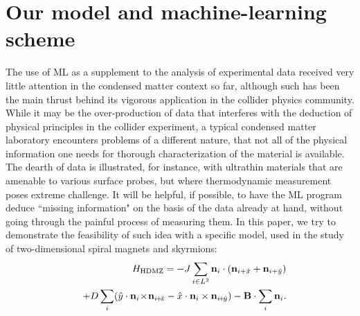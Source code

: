 \documentclass[reprint,amsmath,amssymb,aps,showpacs,superscriptaddress,prb]{revtex4-1}
\newcommand{\ba}{\begin{eqnarray}}
\newcommand{\ea}{\end{eqnarray}}
\renewcommand{\v}[1]{{\bf #1}}
\newcommand{\nn}{\nonumber \\}
\begin{document}
\section{Our model and machine-learning scheme}

The use of ML as a supplement to the analysis of experimental data received very little attention in the condensed matter context  so far, although such has been the main thrust behind its vigorous application in the collider physics community. While it may be the over-production of data that interferes with the deduction of physical principles in the collider experiment, a typical condensed matter laboratory encounters problems of a different nature, that not all of the physical information one needs for thorough characterization of the material is available. The dearth of data is illustrated, for instance, with ultrathin materials that are amenable to various surface probes, but where thermodynamic measurement poses extreme challenge. It will be helpful, if possible, to have the ML program deduce ``missing information" on the basis of the data already at hand, without going through the painful process of measuring them. In this paper, we try to demonstrate the feasibility of such idea with a specific model, used in the study of two-dimensional spiral magnets and skyrmions:
%
\ba && H_{\rm HDMZ} = -J \sum_{i\in L^2} \v n_i \cdot (\v n_{i+\hat{x}} + \v n_{i+\hat{y}} ) \nn
 & & + D \sum_i ( \hat{y} \cdot \v n_i \! \times \! \v n_{i\! +\! \hat{x}} - \hat{x} \cdot \v n_i \times \v n_{i\! +\! \hat{y}} )  - \v B \cdot \sum_i \v n_i .  \label{eq:HDMZ} \ea
%
\end{document}
